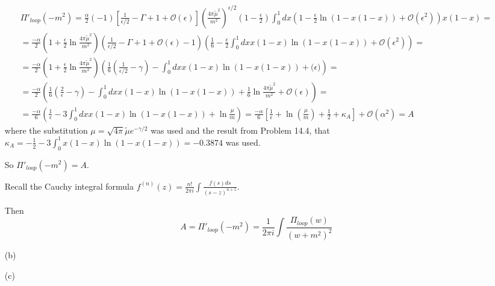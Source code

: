 \documentclass[twoside]{amsart}
\begin{document}
\begin{itemize}
\[
\begin{gathered}
  \Pi'_{loop}(-m^2) = \frac{ \alpha}{2} ( -1) \left[ \frac{ 1}{ \epsilon/2} - \Gamma + 1 + \mathcal{O}(\epsilon) \right] \left( \frac{ 4\pi \widetilde{\mu}^2 }{ m^2} \right)^{\epsilon/2} \left( 1 - \frac{ \epsilon}{2} \right) \int_0^1 dx \left( 1 - \frac{ \epsilon}{2} \ln{ ( 1 - x(1-x) ) } + \mathcal{O}(\epsilon^2) \right) x( 1 - x) = \\ 
  = \frac{ - \alpha}{2} \left( 1 + \frac{ \epsilon}{2} \ln{ \frac{ 4\pi \widetilde{\mu}^2 }{ m^2 } } \right) \left( \frac{1}{ \epsilon/2} - \Gamma + 1 + \mathcal{O}(\epsilon) - 1 \right) \left( \frac{1}{6} - \frac{ \epsilon}{2} \int_0^1 dx x ( 1-x) \ln{ ( 1- x(1-x)) } + \mathcal{O}(\epsilon^2) \right) = \\
  = \frac{ - \alpha}{2} \left( 1 + \frac{ \epsilon}{2} \ln{ \frac{ 4\pi \widetilde{\mu}^2 }{ m^2 } } \right) \left( \frac{1}{6} \left( \frac{ 1 }{ \epsilon/2} - \gamma \right) - \int_0^1 dx x(1-x) \ln{ (1 - x(1-x) )} + \mathcal(\epsilon) \right) = \\ 
  = \frac{- \alpha}{2} \left( \frac{1}{6} \left( \frac{2}{ \epsilon } - \gamma \right) - \int_0^1 dx x(1-x) \ln{ ( 1 - x(1-x)) } + \frac{1}{6} \ln{ \frac{ 4 \pi \widetilde{\mu}^2 }{m^2} } + \mathcal{O}(\epsilon) \right) = \\
  = \frac{ - \alpha}{6} \left( \frac{1}{ \epsilon } - 3 \int_0^1 dx x(1-x) \ln{ ( 1 - x(1-x)) } + \ln{ \frac{ \mu}{m} } \right) = \frac{ - \alpha}{6} \left[ \frac{1}{\epsilon} + \ln{ \left( \frac{ \mu}{m} \right) } + \frac{1}{2} + \kappa_A \right] + \mathcal{O}(\alpha^2) = A
\end{gathered}
\]
where the substitution $\mu = \sqrt{ 4 \pi } \widetilde{\mu} e^{-\gamma/2}$ was used and the result from Problem 14.4, that $\kappa_A = -\frac{1}{2} - 3 \int_0^1 x ( 1 - x) \ln{ (1-x(1-x) ) } = -0.3874$ was used.  

So $\boxed{ \Pi'_{loop}(-m^2) = A}$.  

Recall the Cauchy integral formula $f^{(n)}(z) = \frac{n!}{ 2\pi i} \int \frac{ f(s) ds}{ (s-z)^{n+1} }$.  

Then 
\[
A = \Pi'_{loop}(-m^2) = \frac{1}{2 \pi i} \int \frac{ \Pi_{loop}(w) }{ (w + m^2)^2 }
\]
\item[(b)]
\item[(c)]
\end{itemize}
\end{document}
